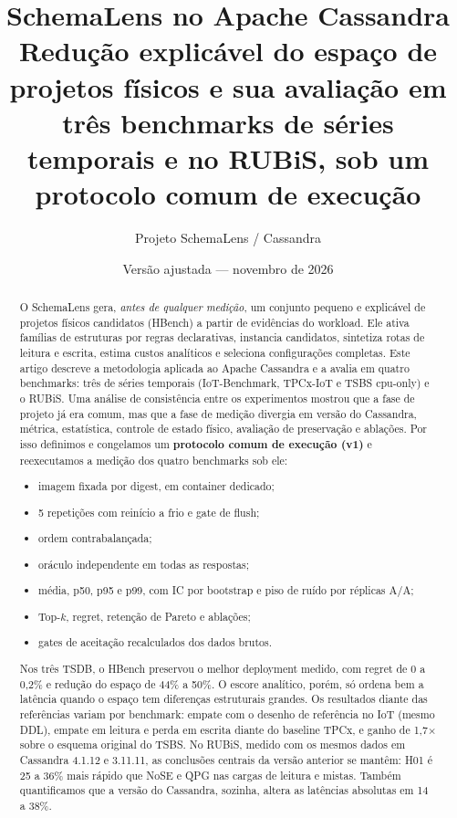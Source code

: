 \documentclass[10pt,a4paper,twoside]{article}
\title{\textbf{SchemaLens no Apache Cassandra}\\[3pt]
\large Redução explicável do espaço de projetos físicos e sua avaliação em três benchmarks de séries temporais e no RUBiS, sob um protocolo comum de execução}
\author{Projeto SchemaLens / Cassandra}
\date{Versão ajustada --- novembro de 2026}
\theoremstyle{definition}\newtheorem{definicao}{Definição}
\begin{document}
\maketitle

\begin{abstract}
\noindent O SchemaLens gera, \emph{antes de qualquer medição}, um conjunto pequeno e explicável de projetos físicos candidatos (HBench) a partir de evidências do workload. Ele ativa famílias de estruturas por regras declarativas, instancia candidatos, sintetiza rotas de leitura e escrita, estima custos analíticos e seleciona configurações completas. Este artigo descreve a metodologia aplicada ao Apache Cassandra e a avalia em quatro benchmarks: três de séries temporais (IoT-Benchmark, TPCx-IoT e TSBS cpu-only) e o RUBiS. Uma análise de consistência entre os experimentos mostrou que a fase de projeto já era comum, mas que a fase de medição divergia em versão do Cassandra, métrica, estatística, controle de estado físico, avaliação de preservação e ablações. Por isso definimos e congelamos um \textbf{protocolo comum de execução (v1)} e reexecutamos a medição dos quatro benchmarks sob ele:
\begin{itemize}
\item imagem fixada por digest, em container dedicado;
\item 5 repetições com reinício a frio e gate de flush;
\item ordem contrabalançada;
\item oráculo independente em todas as respostas;
\item média, p50, p95 e p99, com IC por bootstrap e piso de ruído por réplicas A/A;
\item Top-$k$, regret, retenção de Pareto e ablações;
\item gates de aceitação recalculados dos dados brutos.
\end{itemize}
Nos três TSDB, o HBench preservou o melhor deployment medido, com regret de 0 a 0,2\% e redução do espaço de 44\% a 50\%. O escore analítico, porém, só ordena bem a latência quando o espaço tem diferenças estruturais grandes. Os resultados diante das referências variam por benchmark: empate com o desenho de referência no IoT (mesmo DDL), empate em leitura e perda em escrita diante do baseline TPCx, e ganho de 1,7$\times$ sobre o esquema original do TSBS. No RUBiS, medido com os mesmos dados em Cassandra 4.1.12 e 3.11.11, as conclusões centrais da versão anterior se mantêm: H01 é 25 a 36\% mais rápido que NoSE e QPG nas cargas de leitura e mistas. Também quantificamos que a versão do Cassandra, sozinha, altera as latências absolutas em 14 a 38\%.
\end{abstract}
\end{document}
